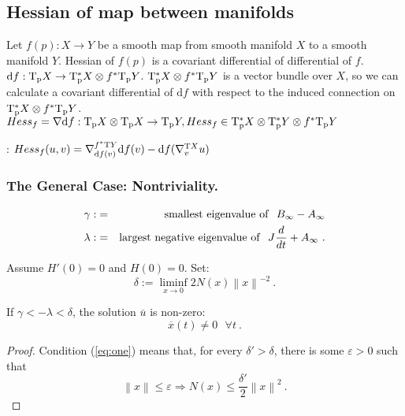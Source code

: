 \documentclass{llncs}
\newcommand{\CovariantDerivManif}[2]{\tensor*{\nabla}{^{#1}_{#2}}}
\newcommand{\CovariantDiff}{\nabla}
\newcommand{\Diff}{\mathrm{d}}
\newcommand{\TangentSpaceP}[1]{\mathrm{T_p}{#1}}
\newcommand{\CotangentSpaceP}[1]{\tensor*{\mathrm{T}}{^{*}_{\mathrm{p}}}{#1}}
\newcommand{\TangentBundle}[1]{\mathrm{T}{#1}}
\newcommand {\DiffSpace}[3]{\CotangentSpaceP{#1}\otimes {#3}^* \TangentSpaceP{#2}}
\newcommand {\HessianSpace}[3]{\CotangentSpaceP{#1}\otimes \CotangentSpaceP{#2}\otimes {#3}^* \TangentSpaceP{#2}}
\begin{document}
\subsection{Hessian of map between manifolds}
Let $f(p):X\to Y$ be a smooth map from smooth manifold $X$ to a smooth manifold $Y$. Hessian of $f(p)$ is a covariant differential of differential of $f$.
$\Diff f:\TangentSpaceP{X}\to\DiffSpace{X}{Y}{f}$.
$\DiffSpace{X}{Y}{f}$ is a vector bundle over $X$, so we can calculate a covariant differential of $\Diff f$ with respect to the induced connection on $\DiffSpace{X}{Y}{f}$.
$Hess_f=\CovariantDiff \Diff f:\TangentSpaceP{X}\otimes\TangentSpaceP{X}\to \TangentSpaceP{Y}, Hess_f\in \HessianSpace{X}{Y}{f}$
\begin{lemma}:
$Hess_f(u,v)=\CovariantDerivManif{f^* \TangentBundle{Y}}{ \Diff f(v)}\Diff f(v) - \Diff f(\CovariantDerivManif{\TangentBundle{X}}{v}u)$
\end{lemma}


%
\subsubsection{The General Case: Nontriviality.} %
\begin{eqnarray}
\gamma :&=&{\rm smallest\ eigenvalue\ of}\ \ B_{\infty} - A_{\infty} \\
   \lambda : &=& {\rm largest\ negative\ eigenvalue\ of}\ \
   J \frac{d}{dt} +A_{\infty}\ .
\end{eqnarray}

\begin{proposition}
Assume $H'(0)=0$ and $ H(0)=0$. Set:
\begin{equation}
   \delta := \liminf_{x\to 0} 2 N (x) \left\|x\right\|^{-2}\ .
   \label{eq:one}
\end{equation}

If $\gamma < - \lambda < \delta$,
the solution $\overline{u}$ is non-zero:
\begin{equation}
   \overline{x} (t) \ne 0\ \ \ \forall t\ .
\end{equation}
\end{proposition}
%
\begin{proof}
Condition (\ref{eq:one}) means that, for every $\delta ' > \delta$, there is some $\varepsilon > 0$ such that \begin{equation}
   \left\|x\right\| \le \varepsilon \Rightarrow N (x) \le
   \frac{\delta '}{2} \left\|x\right\|^{2}\ .
\end{equation}
\end{proof}
\end{document}
